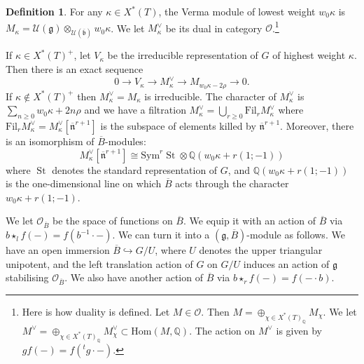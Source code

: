 \documentclass[10pt, oneside]{amsart}
\numberwithin{equation}{subsection}
\theoremstyle{definition}
\newtheorem{definition}[equation]{Definition}
\theoremstyle{remark}
\newcommand{\opn}[1]{\operatorname{#1}}
\def\Q{\mathbb{Q}}
\def\oscr{\mathscr{O}}
\begin{document}
\begin{definition}
For any $\kappa \in X^*(T)$, the Verma module of lowest weight $w_0\kappa$ is $M_\kappa = \mathcal{U}(\mathfrak{g}) \otimes_{\mathcal{U}(\overline{\mathfrak{b}})} w_0\kappa$.  We let $M_\kappa^\vee$ be its dual in category $\mathcal{O}$.\footnote{Here is how duality is defined. Let $M \in \mathcal{O}$. Then $M = \oplus_{\chi \in X^*(T)_{\Q}} M_\chi$. We let $M^\vee = \oplus_{\chi \in X^*(T)_{\Q}} M_\chi^\vee \subset \mathrm{Hom}(M, \Q)$. The action on $M^\vee$ is given by $g f (-) = f( {^tg} \cdot -)$.} 
\end{definition}

If $\kappa \in X^*(T)^+$, let $V_\kappa$ be the irreducible representation of $G$ of highest weight $\kappa$. Then there is an exact sequence 
\[
0 \rightarrow V_\kappa \rightarrow M^\vee_\kappa \rightarrow M_{w_0\kappa -2\rho} \rightarrow 0 .
\]
If $\kappa \notin X^*(T)^+$ then $M^\vee_\kappa = M_\kappa$ is irreducible. 
The character of $M_\kappa^\vee$ is $\sum_{n \geq 0} w_0\kappa +2n \rho$ and we have a filtration $M_\kappa^\vee = \bigcup_{r \geq 0} \mathrm{Fil}_{r} M_\kappa^\vee$ where $\mathrm{Fil}_{r} M_\kappa^\vee = M_\kappa^\vee[\overline{\mathfrak{n}}^{r+1}]$ is the subspace of elements killed by $\overline{\mathfrak{n}}^{r+1}$. Moreover, there is an isomorphism of $\overline{B}$-modules: 
\[
M_\kappa^\vee[\overline{\mathfrak{n}}^{r+1}] \cong \mathrm{Sym}^r \opn{St} \otimes \Q(w_0\kappa + r(1; -1))
\]
where $\opn{St}$ denotes the standard representation of $G$, and $\Q(w_0\kappa + r(1; -1))$ is the one-dimensional line on which $\overline{B}$ acts through the character $w_0\kappa + r(1; -1)$.




 We let $\oscr_{\overline{B}}$ be the space of functions on $\overline{B}$. We equip it with an action of $\overline{B}$ via $b  \star_l f(-) = f(b^{-1} \cdot -)$. We can turn it into a $(\mathfrak{g},\overline{B})$-module  as follows. We have an open immersion $\overline{B} \hookrightarrow G/U$, where $U$ denotes the upper triangular unipotent, and the left translation action of $G$ on $G/U$ induces an action of $\mathfrak{g}$ stabilising $\oscr_{\overline{B}}$.  We also have  another action of $\overline{B}$ via $b\star_r f(-)= f(- \cdot b)$. 
\end{document}
